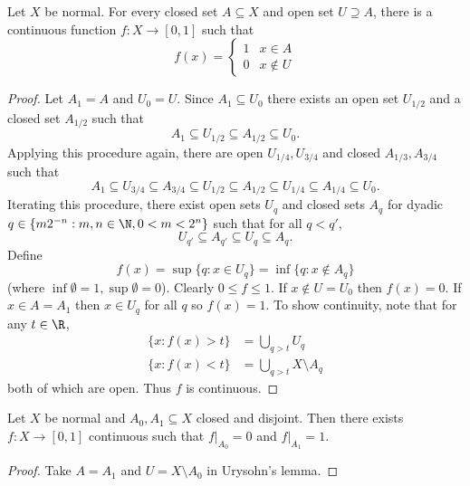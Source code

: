\documentclass[a4paper]{article}
\begin{document}
\begin{proposition}
  Let \(X\) be normal. For every closed set \(A \subseteq X\) and open set \(U \supseteq A\), there is a continuous function \(f: X \to [0, 1]\) such that
  \[
    f(x) =
    \begin{cases}
      1 & x \in A \\
      0 & x \notin U
    \end{cases}
  \]
\end{proposition}

\begin{proof}
  Let \(A_1 = A\) and \(U_0 = U\). Since \(A_1 \subseteq U_0\) there exists an open set \(U_{1/2}\) and a closed set \(A_{1/2}\) such that
  \[
    A_1 \subseteq U_{1/2} \subseteq A_{1/2} \subseteq U_0.
  \]
  Applying this procedure again, there are open \(U_{1/4}, U_{3/4}\) and closed \(A_{1/3}, A_{3/4}\) such that
  \[
    A_1 \subseteq U_{3/4} \subseteq A_{3/4} \subseteq U_{1/2} \subseteq A_{1/2} \subseteq U_{1/4} \subseteq A_{1/4} \subseteq U_0.
  \]
  Iterating this procedure, there exist open sets \(U_q\) and closed sets \(A_q\) for dyadic \(q \in \{m 2^{-n}: m, n \in \N, 0 < m < 2^n\}\) such that for all \(q < q'\),
  \[
    U_{q'} \subseteq A_{q'} \subseteq U_q \subseteq A_q.
  \]
  Define
  \[
    f(x) = \sup \{q: x \in U_q\} = \inf \{q: x \notin A_q\}
  \]
  (where \(\inf \emptyset = 1, \sup \emptyset = 0\)). Clearly \(0 \leq f \leq 1\). If \(x \notin U = U_0\) then \(f(x) = 0\). If \(x \in A = A_1\) then \(x \in U_q\) for all \(q\) so \(f(x) = 1\). To show continuity, note that for any \(t \in \R\),
  \begin{align*}
    \{x: f(x) > t\} &= \bigcup_{q > t} U_q \\
    \{x: f(x) < t\} &= \bigcup_{q > t} X \setminus A_q
  \end{align*}
  both of which are open. Thus \(f\) is continuous.
\end{proof}

\begin{corollary}
  \label{cor:normal space separates closed sets}
  Let \(X\) be normal and \(A_0, A_1 \subseteq X\) closed and disjoint. Then there exists \(f: X \to [0, 1]\) continuous such that \(f|_{A_0} = 0\) and \(f|_{A_1} = 1\).
\end{corollary}

\begin{proof}
  Take \(A = A_1\) and \(U = X \setminus A_0\) in Urysohn's lemma.
\end{proof}
\end{document}
